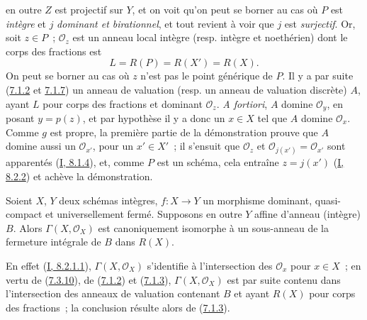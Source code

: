 \begin{enumerate}
en outre $Z$ est projectif sur $Y$, et on voit qu'on peut se borner au cas où
$P$ est \emph{intègre} et $j$ \emph{dominant et birationnel}, et tout revient à
voir que $j$ est \emph{surjectif}. Or, soit $z\in P$~; $\mathcal{O}_z$ est un
anneau local intègre (resp. intègre et noethérien) dont le corps des fractions
est
\[
L=R(P)=R(X')=R(X).
\]
On peut se borner au cas où $z$ n'est pas le point générique de $P$. Il y a par
suite (\hyperref[II.7.1.2-fr]{7.1.2} et
\hyperref[II.7.1.7-fr]{7.1.7}) un anneau de valuation (resp. un anneau de
valuation discrète) $A$, ayant $L$ pour corps des fractions et dominant
$\mathcal{O}_z$. \emph{A fortiori}, $A$ domine $\mathcal{O}_y$, en posant
$y=p(z)$, et par hypothèse il y a donc un $x\in X$ tel que $A$ domine
$\mathcal{O}_x$. Comme $g$ est propre, la première partie de la démonstration
prouve que $A$ domine aussi un $\mathcal{O}_{x'}$, pour un $x'\in X'$~; il
s'ensuit que $\mathcal{O}_z$ et $\mathcal{O}_{j(x')}=\mathcal{O}_{x'}$ sont
apparentés (\hyperref[I.8.1.4-fr]{I, 8.1.4}), et, comme $P$ est un schéma, cela
entraîne $z=j(x')$ (\hyperref[I.8.2.2-fr]{I, 8.2.2}) et achève la démonstration.
\end{enumerate}

\begin{corollary}[7.3.11]
\label{II.7.3.11-fr}
Soient $X$, $Y$ deux schémas intègres, $f:X\to Y$ un morphisme dominant,
quasi-compact et universellement fermé. Supposons en outre $Y$ affine d'anneau
(intègre) $B$. Alors $\Gamma(X,\mathcal{O}_X)$ est canoniquement isomorphe à
un sous-anneau de la fermeture intégrale de $B$ dans $R(X)$.
\end{corollary}

En effet (\hyperref[I.8.2.1.1-fr]{I, 8.2.1.1}),
$\Gamma(X,\mathcal{O}_X)$ s'identifie à l'intersection des $\mathcal{O}_x$ pour
$x\in X$~; en vertu de (\hyperref[II.7.3.10-fr]{7.3.10}), de
(\hyperref[II.7.1.2-fr]{7.1.2}) et (\hyperref[II.7.1.3-fr]{7.1.3}),
$\Gamma(X,\mathcal{O}_X)$ est par suite contenu dans l'intersection des
anneaux de valuation contenant $B$ et ayant $R(X)$ pour corps des fractions~;
la conclusion résulte alors de (\hyperref[II.7.1.3-fr]{7.1.3}).

